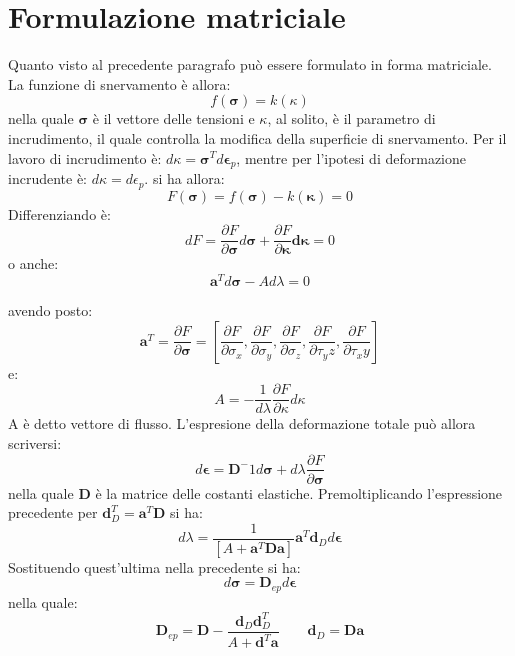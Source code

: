 \section{Formulazione matriciale}
Quanto visto al precedente paragrafo può essere formulato in forma matriciale. La funzione di snervamento è allora:
\begin{equation}
	f(\boldsymbol{\sigma})= k(\kappa) 
\end{equation}
nella quale $\boldsymbol{\sigma}$ è il vettore delle tensioni e $\kappa$, al solito, è il parametro di incrudimento, il quale controlla la modifica della superficie di snervamento. Per il lavoro di incrudimento è: $d \kappa = \boldsymbol{\sigma}^T d\boldsymbol{\epsilon}_p$, mentre per l'ipotesi di deformazione incrudente è: $d \kappa = d \epsilon_p$. si ha allora:
\begin{equation}
	F(\boldsymbol{\sigma}) = f(\boldsymbol{\sigma}) - k(\boldsymbol{\kappa}) = 0
\end{equation}
Differenziando è:
\begin{equation}
	dF = \frac{\partial F }{\partial \boldsymbol{\sigma}} d \boldsymbol{\sigma} + \frac{\partial F }{\partial \boldsymbol{\kappa}} \boldsymbol{d \kappa}  = 0
\end{equation}
o anche:
\begin{equation}
	\mathbf{a}^T d \boldsymbol{\sigma} - A d \lambda = 0
\end{equation}

avendo posto:
\begin{equation}
	\mathbf{a}^T = \frac{\partial F}{\partial \boldsymbol{\sigma}} = [\frac{\partial F}{\partial \sigma_x}, \frac{\partial F}{\partial \sigma_y}, \frac{\partial F}{\partial \sigma_z}, \frac{\partial F}{\partial \tau_yz}, \frac{\partial F}{\partial \tau_xy}]
\end{equation}
e:
\begin{equation}
	A = - \frac{1}{d \lambda} \frac{\partial F}{\partial \kappa} d\kappa
\end{equation}
A è detto vettore di flusso. L'espresione della deformazione totale può allora scriversi:
\begin{equation}
	d \boldsymbol{\epsilon} = \mathbf{D}^-1 d \boldsymbol{\sigma} + d \lambda \frac{\partial F}{\partial \boldsymbol{\sigma}}
\end{equation}
nella quale $\mathbf{D}$ è la matrice delle costanti elastiche. Premoltiplicando l'espressione precedente per $\mathbf{d}_D^T = \mathbf{a}^T \mathbf{D}$ si ha:
\begin{equation}
	d \lambda = \frac{1}{[A + \mathbf{a}^T \mathbf{Da}]} \mathbf{a}^T \mathbf{d}_D d \boldsymbol{\epsilon}
\end{equation}
Sostituendo quest'ultima nella precedente si ha:
\begin{equation}
	d\boldsymbol{\sigma} = \mathbf{D}_{ep} d \boldsymbol{\epsilon}
\end{equation}
nella quale:
\begin{equation}
	\mathbf{D}_{ep} = \mathbf{D}- \frac{\mathbf{d}_D \mathbf{d}_D^T}{A + \mathbf{d}^T \mathbf{a}} \qquad \boldsymbol{d}_D = \mathbf{Da}
\end{equation}


